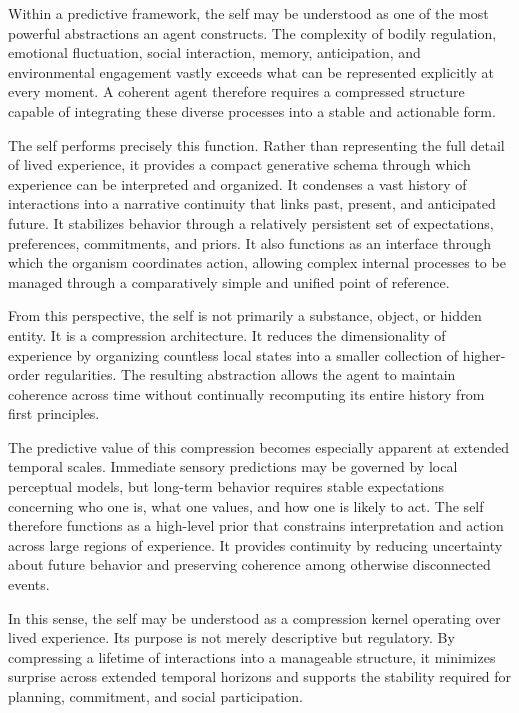 \documentclass[12pt,letterpaper]{article}
\theoremstyle{remark}
\begin{document}
Within a predictive framework, the self may be understood as one of the most powerful abstractions an agent constructs. The complexity of bodily regulation, emotional fluctuation, social interaction, memory, anticipation, and environmental engagement vastly exceeds what can be represented explicitly at every moment. A coherent agent therefore requires a compressed structure capable of integrating these diverse processes into a stable and actionable form.

The self performs precisely this function. Rather than representing the full detail of lived experience, it provides a compact generative schema through which experience can be interpreted and organized. It condenses a vast history of interactions into a narrative continuity that links past, present, and anticipated future. It stabilizes behavior through a relatively persistent set of expectations, preferences, commitments, and priors. It also functions as an interface through which the organism coordinates action, allowing complex internal processes to be managed through a comparatively simple and unified point of reference.

From this perspective, the self is not primarily a substance, object, or hidden entity. It is a compression architecture. It reduces the dimensionality of experience by organizing countless local states into a smaller collection of higher-order regularities. The resulting abstraction allows the agent to maintain coherence across time without continually recomputing its entire history from first principles.

The predictive value of this compression becomes especially apparent at extended temporal scales. Immediate sensory predictions may be governed by local perceptual models, but long-term behavior requires stable expectations concerning who one is, what one values, and how one is likely to act. The self therefore functions as a high-level prior that constrains interpretation and action across large regions of experience. It provides continuity by reducing uncertainty about future behavior and preserving coherence among otherwise disconnected events.

In this sense, the self may be understood as a compression kernel operating over lived experience. Its purpose is not merely descriptive but regulatory. By compressing a lifetime of interactions into a manageable structure, it minimizes surprise across extended temporal horizons and supports the stability required for planning, commitment, and social participation.
\end{document}
